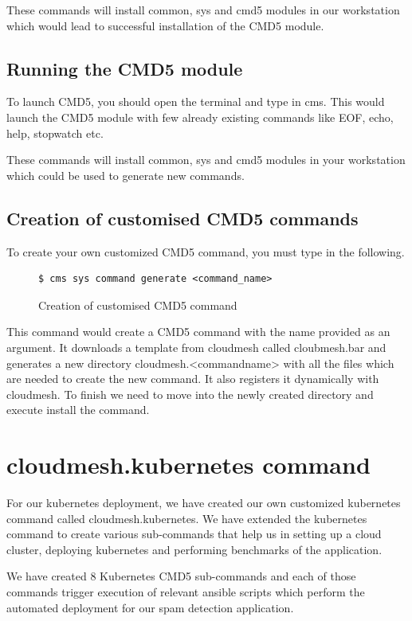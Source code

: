 \documentclass[9pt,twocolumn,twoside]{../../styles/osajnl}
\begin{document}
{\noindent
These commands will install common, sys and cmd5 modules in our
workstation which would lead to successful installation of the CMD5
module.

\subsection{Running the CMD5 module}
To launch CMD5, you should open the terminal and type in cms. This
would launch the CMD5 module with few already existing commands like
EOF, echo, help, stopwatch etc.

These commands will install common, sys and cmd5 modules in your
workstation which could be used to generate new commands.

\subsection{Creation of customised CMD5 commands}
To create your own customized CMD5 command, you must type in the
following.

\begin{figure}[H]
\begin{verbatim}
$ cms sys command generate <command_name>
\end{verbatim}
\caption{Creation of customised CMD5 command}
\label{Creation of customised CMD5 command}
\end{figure}


\noindent
This command would create a CMD5 command with the name provided as an
argument. It downloads a template from cloudmesh called cloubmesh.bar
and generates a new directory cloudmesh.<command\textunderscore name>
with all the files which are needed to create the new command. It also
registers it dynamically with cloudmesh. To finish we need to move
into the newly created directory and execute install the command.

\section{cloudmesh.kubernetes command}
For our kubernetes deployment, we have
created our own customized kubernetes command called
cloudmesh.kubernetes. We have extended the kubernetes command to
create various sub-commands that help us in setting up a cloud cluster,
deploying kubernetes and performing benchmarks of the application.

\noindent
We have created 8 Kubernetes CMD5 sub-commands and each of those
commands trigger execution of relevant ansible scripts which perform
the automated deployment for our spam detection application.\newline

}
\end{document}
